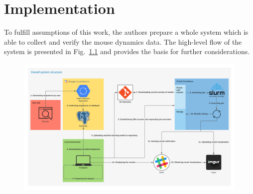 \chapter{Implementation}\label{ch:implementation}
To fulfill assumptions of this work, the authors prepare a whole system which is able to collect and verify the mouse dynamics data.
The high-level flow of the system is presented in Fig.~\ref{fig:overall_system_structure} and provides the basis for further considerations.
\begin{figure}[!hbt]
    \includegraphics[width=\linewidth]{resources/overall_system_structure}
    \label{fig:overall_system_structure}
\end{figure}


